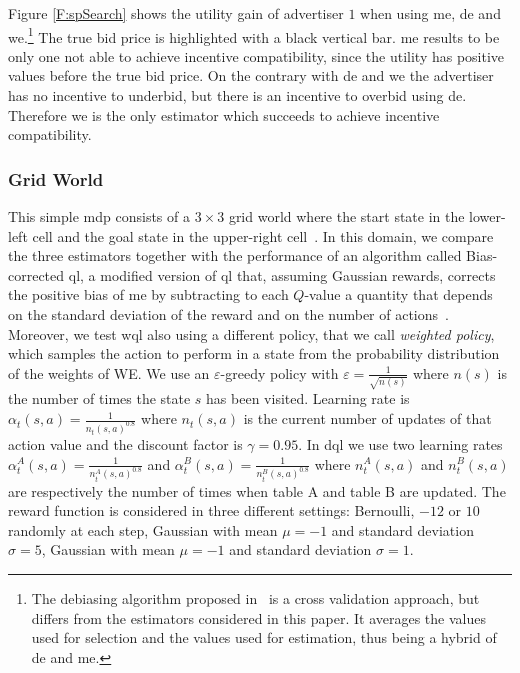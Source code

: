 Figure \ref{F:spSearch} shows the utility gain of advertiser $1$ when using \gls{me}, \gls{de} and \gls{we}.\footnote{The debiasing algorithm proposed in~\cite{xu2013mab} is a cross validation approach, but differs from the estimators considered in this paper. It averages the values used for selection and the values used for estimation, thus being a hybrid of \gls{de} and \gls{me}.}
The true bid price is highlighted with a black vertical bar. \gls{me} results to be only one not able to achieve incentive compatibility, since the utility has positive values before the true bid price. On the contrary with \gls{de} and \gls{we} the advertiser has no incentive to underbid, but there is an incentive to overbid using \gls{de}. Therefore \gls{we} is the only estimator which succeeds to achieve incentive compatibility.

\subsubsection{Grid World}
This simple \gls{mdp} consists of a $3 \times 3$ grid world where the start state in the lower-left cell and the goal state in the upper-right cell~\cite{van2010double}. 
In this domain, we compare the three estimators together with the performance of an algorithm called Bias-corrected \gls{ql}, a modified version of \gls{ql} that, assuming Gaussian rewards, corrects the positive bias of \gls{me} by subtracting to each $Q$-value a quantity that depends on the standard deviation of the reward and on the number of actions~\cite{lee2012intelligent,lee2013bias}. Moreover, we test \gls{wql} also using a different policy, that we call \textit{weighted policy}, which samples the action to perform in a state from the probability distribution of the weights of WE.
We use an $\varepsilon$-greedy policy with $\varepsilon = \frac{1}{\sqrt{n(s)}}$ where $n(s)$ is the number of times the state $s$ has been visited.
Learning rate is $\alpha_t(s, a) = \frac{1}{n_t(s, a)^{0.8}}$ where $n_t(s, a)$ is the current number of updates of that action value and the discount factor is $\gamma = 0.95$. 
In \gls{dql} we use two learning rates $\alpha_t^A(s, a) = \frac{1}{n_t^A(s, a)^{0.8}}$ and $\alpha_t^B(s, a) = \frac{1}{n_t^B(s, a)^{0.8}}$ where $n_t^A(s, a)$ and $n_t^B(s, a)$ are respectively the number of times when table A and table B are updated. 
The reward function is considered in three different settings: Bernoulli, $-12$ or $10$ randomly at each step, Gaussian with mean $\mu = -1$ and standard deviation $\sigma = 5$, Gaussian with mean $\mu = -1$ and standard deviation $\sigma = 1$. 
